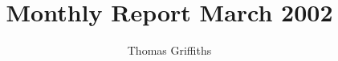 


\title{Monthly Report March 2002}
\author{Thomas Griffiths}



\maketitle




\printbibliography

  